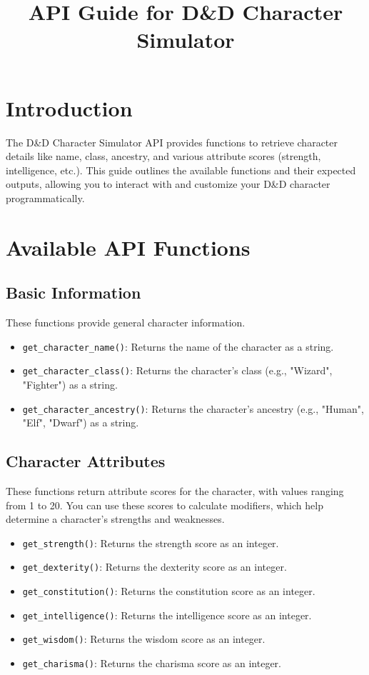 \documentclass{article}
\title{API Guide for D\&D Character Simulator}
\author{}
\date{}
\begin{document}
	
	\maketitle
	
	\section*{Introduction}
	The D\&D Character Simulator API provides functions to retrieve character details like name, class, ancestry, and various attribute scores (strength, intelligence, etc.). This guide outlines the available functions and their expected outputs, allowing you to interact with and customize your D\&D character programmatically.
	
	\section*{Available API Functions}
	
	\subsection*{Basic Information}
	These functions provide general character information.
	
	\begin{itemize}
		\item \texttt{get\_character\_name()}: Returns the name of the character as a string.
		\item \texttt{get\_character\_class()}: Returns the character’s class (e.g., "Wizard", "Fighter") as a string.
		\item \texttt{get\_character\_ancestry()}: Returns the character’s ancestry (e.g., "Human", "Elf", "Dwarf") as a string.
	\end{itemize}
	
	\subsection*{Character Attributes}
	These functions return attribute scores for the character, with values ranging from 1 to 20. You can use these scores to calculate modifiers, which help determine a character’s strengths and weaknesses.
	
	\begin{itemize}
		\item \texttt{get\_strength()}: Returns the strength score as an integer.
		\item \texttt{get\_dexterity()}: Returns the dexterity score as an integer.
		\item \texttt{get\_constitution()}: Returns the constitution score as an integer.
		\item \texttt{get\_intelligence()}: Returns the intelligence score as an integer.
		\item \texttt{get\_wisdom()}: Returns the wisdom score as an integer.
		\item \texttt{get\_charisma()}: Returns the charisma score as an integer.
	\end{itemize}
	
\end{document}
